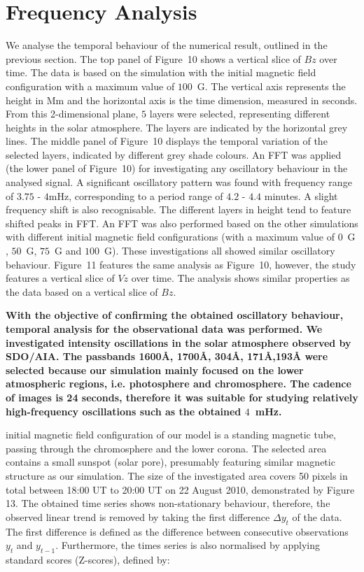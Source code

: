 \documentclass[physics,article,submit,pdftex,moreauthors]{Definitions/mdpi}
\begin{document}
\section{Frequency Analysis}

 We analyse the temporal behaviour of the numerical result, outlined in the previous section. The top panel of Figure~10 shows a vertical slice of $Bz$ over time.  The data is based on the simulation with the initial magnetic field configuration with a maximum value of $100$~G. The vertical axis represents the height in Mm and the horizontal axis is the time dimension, measured in seconds. From this 2-dimensional plane, $5$ layers were selected, representing different heights in the solar atmosphere. The layers are indicated by the horizontal grey lines.   The middle panel of Figure~10 displays the temporal variation of the selected layers, indicated by different grey shade colours. An FFT was applied (the lower panel of Figure~10) for investigating any oscillatory behaviour in the analysed signal. A significant oscillatory pattern was found with frequency range of $3.75$ - $4$mHz, corresponding to a period range of $4.2$ - $4.4$ minutes. A slight frequency shift is also recognisable. The different layers in height tend to feature shifted peaks in FFT. An FFT was also performed based on the other simulations with different initial magnetic field configurations (with a maximum value of $0$~G , $50$~G,  $75$~G  and $100$~G). These investigations all showed similar oscillatory behaviour.  Figure~11 features the same analysis as Figure~10, however, the study features a vertical slice of $Vz$ over time. The analysis shows similar properties as the data based on a vertical slice of $Bz$.

{\bf With the objective of confirming the obtained oscillatory behaviour, temporal analysis for the observational data was performed. We investigated intensity oscillations in the solar atmosphere observed by SDO/AIA. The passbands 1600{\AA}, 1700{\AA}, 304{\AA}, 171{\AA},193{\AA} were selected because our simulation mainly focused on the lower atmospheric regions, i.e. photosphere and chromosphere. The cadence of images is 24 seconds, therefore it was suitable for studying relatively high-frequency oscillations such as the obtained $4$~mHz.}

{\bfThe initial magnetic field configuration of our model is a standing magnetic tube, passing through the chromosphere and the lower corona.  The  selected area contains a small sunspot (solar pore), presumably featuring similar magnetic structure as our simulation.} The size of the investigated area covers 50 pixels in total between 18:00 UT to 20:00 UT on 22 August 2010, demonstrated by Figure 13. The obtained time series shows non-stationary behaviour, therefore, the observed linear trend is removed by taking the first difference $\Delta  y_{t}$ of the data. The first difference is defined as the difference between consecutive observations $y_{t}$ and $y_{t-1}$. Furthermore, the times series is also normalised by applying standard scores (Z-scores), defined by:
\end{document}
